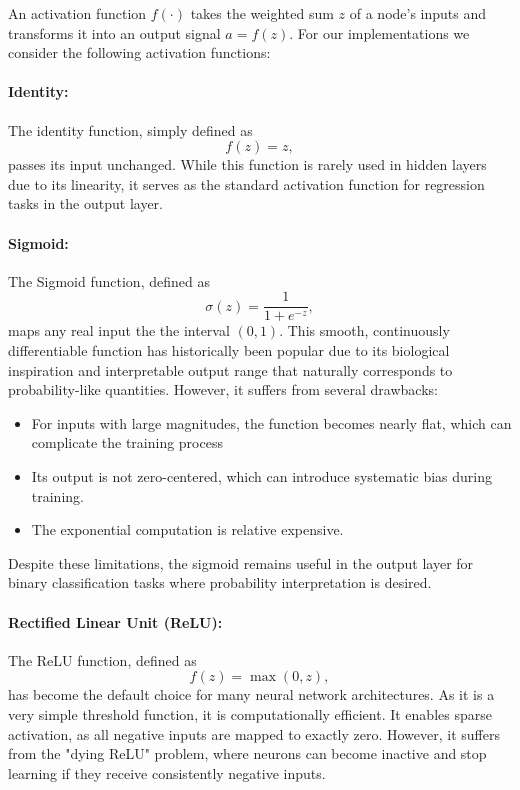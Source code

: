 \documentclass[aps,pra,english,notitlepage,reprint,nofootinbib]{revtex4-1}  %
\begin{document}
An activation function \( f(\cdot) \) takes the weighted sum \( z \) of a node's inputs and transforms it into an output signal \( a = f(z) \). For our implementations we consider the following activation functions: \\

\paragraph*{Identity:}
The identity function, simply defined as
\begin{equation*}
    f(z) = z,
\end{equation*}
passes its input unchanged. While this function is rarely used in hidden layers due to its linearity, it serves as the standard activation function for regression tasks in the output layer.  
\paragraph*{Sigmoid:}
The Sigmoid function, defined as
 \begin{equation}
    \sigma(z) = \frac{1}{1 + e^{-z}},
 \end{equation}
  maps any real input the the interval \( (0, 1) \). This smooth, continuously differentiable function has historically been popular due to its biological inspiration and interpretable output range that naturally corresponds to probability-like quantities. However, it suffers from several drawbacks:
\begin{itemize}
    \item For inputs with large magnitudes, the function becomes nearly flat, which can complicate the training process
    \item Its output is not zero-centered, which can introduce systematic bias during training.
    \item The exponential computation is relative expensive.
\end{itemize}

Despite these limitations, the sigmoid remains useful in the output layer for binary classification tasks where probability interpretation is desired.

\paragraph*{Rectified Linear Unit (ReLU):}
The ReLU function, defined as 
\begin{equation}
    f(z) = \max(0, z),
\end{equation}
has become the default choice for many neural network architectures. As it is a very simple threshold function, it is computationally efficient. It enables sparse activation, as all negative inputs are mapped to exactly zero. However, it suffers from the "dying ReLU" problem, where neurons can become inactive and stop learning if they receive consistently negative inputs.
\end{document}
